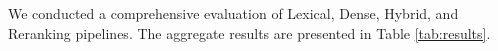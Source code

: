 We conducted a comprehensive evaluation of Lexical, Dense, Hybrid, and Reranking pipelines. The aggregate results are presented in Table \ref{tab:results}.



